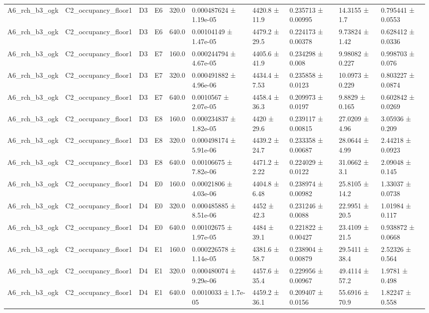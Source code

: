 \begin{table}
\begin{tabular}{llllllllll}
A6\_rch\_b3\_ogk & C2\_occupancy\_floor1 & D3 & E6 & 320.0 & 0.000487624 ± 1.19e-05 & 4420.8 ± 11.9 & 0.235713 ± 0.00995 & 14.3155 ± 1.7 & 0.795441 ± 0.0553 \\
A6\_rch\_b3\_ogk & C2\_occupancy\_floor1 & D3 & E6 & 640.0 & 0.00104149 ± 1.47e-05 & 4479.2 ± 29.5 & 0.224173 ± 0.00378 & 9.73824 ± 1.42 & 0.628412 ± 0.0336 \\
A6\_rch\_b3\_ogk & C2\_occupancy\_floor1 & D3 & E7 & 160.0 & 0.000244794 ± 4.67e-05 & 4405.6 ± 41.9 & 0.234298 ± 0.008 & 9.98082 ± 0.227 & 0.998703 ± 0.076 \\
A6\_rch\_b3\_ogk & C2\_occupancy\_floor1 & D3 & E7 & 320.0 & 0.000491882 ± 4.96e-06 & 4434.4 ± 7.53 & 0.235858 ± 0.0123 & 10.0973 ± 0.229 & 0.803227 ± 0.0874 \\
A6\_rch\_b3\_ogk & C2\_occupancy\_floor1 & D3 & E7 & 640.0 & 0.0010567 ± 2.07e-05 & 4458.4 ± 36.3 & 0.209973 ± 0.0197 & 9.8829 ± 0.165 & 0.602842 ± 0.0269 \\
A6\_rch\_b3\_ogk & C2\_occupancy\_floor1 & D3 & E8 & 160.0 & 0.000234837 ± 1.82e-05 & 4420 ± 29.6 & 0.239117 ± 0.00815 & 27.0209 ± 4.96 & 3.05936 ± 0.209 \\
A6\_rch\_b3\_ogk & C2\_occupancy\_floor1 & D3 & E8 & 320.0 & 0.000498174 ± 5.91e-06 & 4439.2 ± 24.7 & 0.233358 ± 0.00687 & 28.0644 ± 4.99 & 2.44218 ± 0.0923 \\
A6\_rch\_b3\_ogk & C2\_occupancy\_floor1 & D3 & E8 & 640.0 & 0.00106675 ± 7.82e-06 & 4471.2 ± 2.22 & 0.224029 ± 0.0122 & 31.0662 ± 3.1 & 2.09048 ± 0.145 \\
A6\_rch\_b3\_ogk & C2\_occupancy\_floor1 & D4 & E0 & 160.0 & 0.00021806 ± 4.03e-06 & 4404.8 ± 6.48 & 0.238974 ± 0.00982 & 25.8105 ± 14.2 & 1.33037 ± 0.0738 \\
A6\_rch\_b3\_ogk & C2\_occupancy\_floor1 & D4 & E0 & 320.0 & 0.000485885 ± 8.51e-06 & 4452 ± 42.3 & 0.231246 ± 0.0088 & 22.9951 ± 20.5 & 1.01984 ± 0.117 \\
A6\_rch\_b3\_ogk & C2\_occupancy\_floor1 & D4 & E0 & 640.0 & 0.00102675 ± 1.97e-05 & 4484 ± 39.1 & 0.221822 ± 0.00427 & 23.4109 ± 21.5 & 0.938872 ± 0.0668 \\
A6\_rch\_b3\_ogk & C2\_occupancy\_floor1 & D4 & E1 & 160.0 & 0.000226578 ± 1.14e-05 & 4381.6 ± 58.7 & 0.238904 ± 0.00879 & 29.5411 ± 38.4 & 2.52326 ± 0.564 \\
A6\_rch\_b3\_ogk & C2\_occupancy\_floor1 & D4 & E1 & 320.0 & 0.000480074 ± 9.29e-06 & 4457.6 ± 35.4 & 0.229956 ± 0.00967 & 49.4114 ± 57.2 & 1.9781 ± 0.498 \\
A6\_rch\_b3\_ogk & C2\_occupancy\_floor1 & D4 & E1 & 640.0 & 0.0010033 ± 1.7e-05 & 4459.2 ± 36.1 & 0.209407 ± 0.0156 & 55.6916 ± 70.9 & 1.82247 ± 0.558 \\

\end{tabular}
\end{table}

